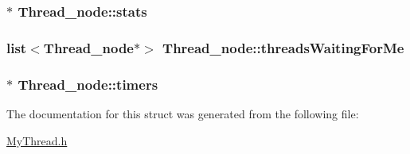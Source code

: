 \hypertarget{structThread__node_a02ad13262955a13452a09c69f5e02f4a}{
\subsubsection[{stats}]{$\ast$ Thread\-\_\-node\-::stats}}\label{structThread__node_a02ad13262955a13452a09c69f5e02f4a}
\hypertarget{structThread__node_a8eac456fc2a97193b14cba7ad0ef44a0}{
\subsubsection[{threads\-Waiting\-For\-Me}]{\setlength{\rightskip}{0pt plus 5cm}list$<${\bf Thread\-\_\-node}$\ast$$>$ Thread\-\_\-node\-::threads\-Waiting\-For\-Me}}\label{structThread__node_a8eac456fc2a97193b14cba7ad0ef44a0}
\hypertarget{structThread__node_a76a12b75a2dd6b8b8b065bd69e8fce40}{
\subsubsection[{timers}]{$\ast$ Thread\-\_\-node\-::timers}}\label{structThread__node_a76a12b75a2dd6b8b8b065bd69e8fce40}


The documentation for this struct was generated from the following file\-:\begin{DoxyCompactItemize}
\item 
\hyperlink{MyThread_8h}{My\-Thread.\-h}\end{DoxyCompactItemize}
